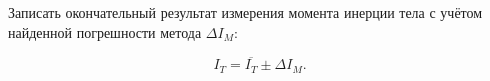 \item Записать окончательный результат измерения момента инерции тела с учётом найденной погрешности метода $\Delta I_M$:

    \begin{equation*}
        I_T = \overline{I_T}\pm \Delta I_M.
    \end{equation*}